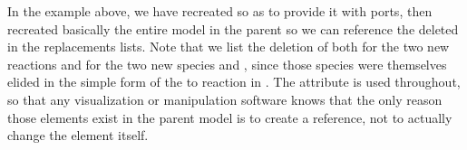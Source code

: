 
In the example above, we have recreated  so as to provide it
with ports, then recreated basically the entire model in the parent
 so we can reference the deleted  in the
replacements lists.  Note that we list the deletion of  both
for the two new reactions and for the two new species  and
, since those species were themselves elided in the simple form
of the  to  reaction in .  The attribute
 is used throughout, so that any visualization or
manipulation software knows that the only reason those elements exist in
the parent model is to create a reference, not to actually change the
element itself.

